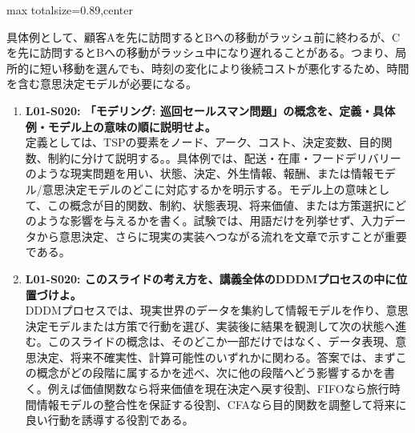 \begin{minipage}[t]{0.58\textwidth}
\begin{adjustbox}{max totalsize={\textwidth}{0.89\textheight},center}
\begin{minipage}{\textwidth}
具体例として、顧客Aを先に訪問するとBへの移動がラッシュ前に終わるが、Cを先に訪問するとBへの移動がラッシュ中になり遅れることがある。つまり、局所的に短い移動を選んでも、時刻の変化により後続コストが悪化するため、時間を含む意思決定モデルが必要になる。\par{}\begin{enumerate}\item \textbf{L01-S020: 「モデリング: 巡回セールスマン問題」の概念を、定義・具体例・モデル上の意味の順に説明せよ。}\\定義としては、TSPの要素をノード、アーク、コスト、決定変数、目的関数、制約に分けて説明する。。具体例では、配送・在庫・フードデリバリーのような現実問題を用い、状態、決定、外生情報、報酬、または情報モデル/意思決定モデルのどこに対応するかを明示する。モデル上の意味として、この概念が目的関数、制約、状態表現、将来価値、または方策選択にどのような影響を与えるかを書く。試験では、用語だけを列挙せず、入力データから意思決定、さらに現実の実装へつながる流れを文章で示すことが重要である。\item \textbf{L01-S020: このスライドの考え方を、講義全体のDDDMプロセスの中に位置づけよ。}\\DDDMプロセスでは、現実世界のデータを集約して情報モデルを作り、意思決定モデルまたは方策で行動を選び、実装後に結果を観測して次の状態へ進む。このスライドの概念は、そのどこか一部だけではなく、データ表現、意思決定、将来不確実性、計算可能性のいずれかに関わる。答案では、まずこの概念がどの段階に属するかを述べ、次に他の段階へどう影響するかを書く。例えば価値関数なら将来価値を現在決定へ戻す役割、FIFOなら旅行時間情報モデルの整合性を保証する役割、CFAなら目的関数を調整して将来に良い行動を誘導する役割である。\end{enumerate}
\end{minipage}
\end{adjustbox}
\end{minipage}


